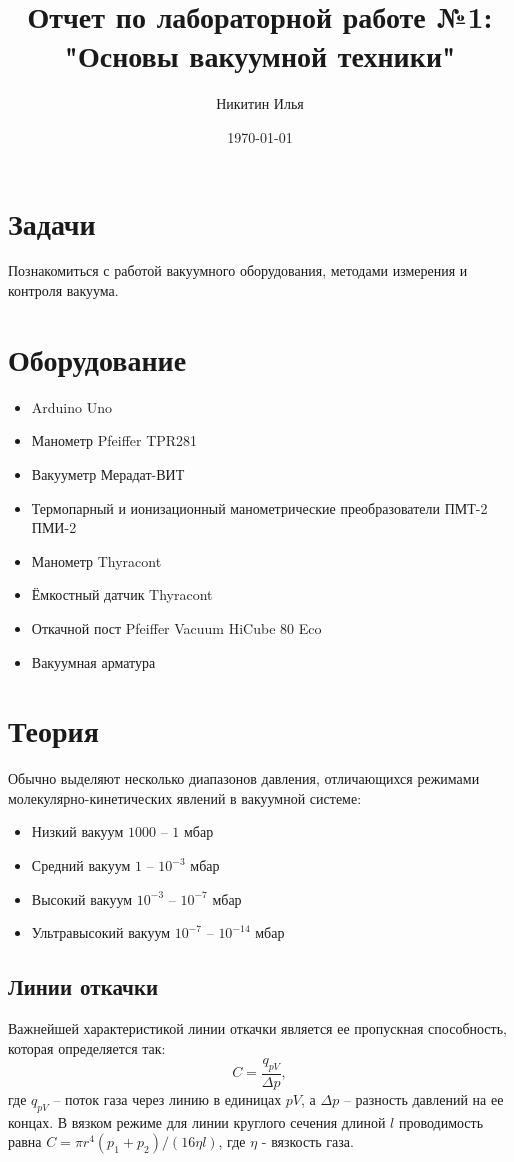 \documentclass[a4paper,14pt]{extarticle}
\author{Никитин Илья}
\title{Отчет по лабораторной работе №1: "Основы вакуумной техники"}
\date{\today}
\begin{document}
	
	\maketitle
	\tableofcontents

	\section{Задачи}
		Познакомиться с работой вакуумного оборудования, методами измерения и контроля вакуума.
	\section{Оборудование}
		\begin{itemize}
			\item Arduino Uno
			\item Манометр Pfeiffer TPR281
			\item Вакууметр Мерадат-ВИТ
			\item Термопарный и ионизационный манометрические преобразователи ПМТ-2	ПМИ-2
			\item Манометр Thyracont
			\item Ёмкостный датчик Thyracont
			\item Откачной пост Pfeiffer Vacuum HiCube 80 Eco 
			\item Вакуумная арматура
		\end{itemize}
	\section{Теория}
		Обычно выделяют несколько диапазонов давления, отличающихся режимами молекулярно-кинетических явлений в вакуумной системе:
		\begin{itemize}
			\item Низкий вакуум $1000$ -- $1$ мбар
			\item Средний вакуум $1$ -- $10^{-3}$ мбар
			\item Высокий вакуум $10^{-3}$ -- $10^{-7}$ мбар
			\item Ультравысокий вакуум $10^{-7}$ -- $10^{-14}$ мбар
		\end{itemize}
			\subsection{Линии откачки}
			Важнейшей характеристикой линии откачки является ее пропускная способность, которая определяется так:
			\begin{equation}
				C = \frac{q_{p V}}{\Delta p},
			\end{equation}
			где $q_{p V}$ -- поток газа через линию в единицах $p V$, а $\Delta p$ -- разность давлений на ее концах.
			В вязком режиме для линии круглого сечения длиной $l$ проводимость равна $C = \pi r^4 (p_1 + p_2) / (16 \eta l)$, где $\eta$ - вязкость газа.
			
\end{document}
